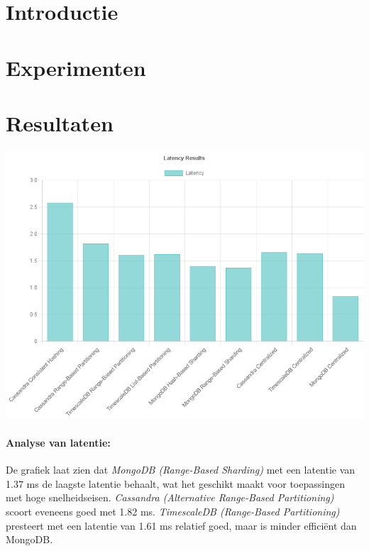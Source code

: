 \documentclass[a0,portrait]{hogent-poster}
\begin{document}
\begin{multicols}{2} %

\section{Introductie}



\section{Experimenten}

\section{Resultaten}

\begin{center}
  \captionsetup{type=figure}
  \includegraphics[width=0.75\linewidth]{Latency.png}
\end{center}

\paragraph{Analyse van latentie:}
De grafiek laat zien dat \textit{MongoDB (Range-Based Sharding)} met een latentie van 1.37 ms de laagste latentie behaalt, wat het geschikt maakt voor toepassingen met hoge snelheidseisen. \textit{Cassandra (Alternative Range-Based Partitioning)} scoort eveneens goed met 1.82 ms. \textit{TimescaleDB (Range-Based Partitioning)} presteert met een latentie van 1.61 ms relatief goed, maar is minder efficiënt dan MongoDB.


\end{multicols}
\end{document}
